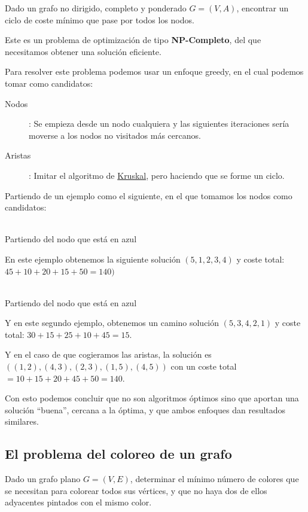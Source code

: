 \documentclass[10pt,a4paper,spanish]{report}
\theoremstyle{definition}
\theoremstyle{remark}
\begin{document}
Dado un grafo no dirigido, completo y ponderado $G=(V,A)$, encontrar un ciclo de coste mínimo que pase por todos los nodos.

Este es un problema de optimización de tipo \textbf{NP-Completo}, del que necesitamos obtener una solución eficiente.

Para resolver este problema podemos usar un enfoque greedy, en el cual podemos tomar como candidatos:

\begin{description}
    \item [Nodos]: Se empieza desde un nodo cualquiera y las siguientes iteraciones sería moverse a los nodos no visitados más cercanos.

    \item [Aristas]: Imitar el algoritmo de \hyperref[kruskal]{Kruskal}, pero haciendo que se forme un ciclo.
\end{description}

Partiendo de un ejemplo como el siguiente, en el que tomamos los nodos como candidatos:

\begin{center}
    
    \\Partiendo del nodo que está en azul
\end{center}

En este ejemplo obtenemos la siguiente solución $(5,1,2,3,4)$ y coste total: $45+10+20+15+50=140)$

\begin{center}
    
    \\Partiendo del nodo que está en azul
\end{center}

Y en este segundo ejemplo, obtenemos un camino solución $(5,3,4,2,1)$ y coste total: $30+15+25+10+45=15$.

Y en el caso de que cogieramos las aristas, la solución es $((1,2),(4,3),(2,3),(1,5),(4,5))$ con un coste total $= 10+15+20+45+50=140$.

Con esto podemos concluir que no son algoritmos óptimos sino que aportan una solución ``buena'', cercana a la óptima, y que ambos enfoques dan resultados similares.

\subsection{\textcolor{electriccrimson}El problema del coloreo de un grafo}

Dado un grafo plano $G=(V,E)$, determinar el mínimo número de colores que se necesitan para colorear todos sus vértices, y que no haya dos de ellos adyacentes pintados con el mismo color. 
\end{document}
